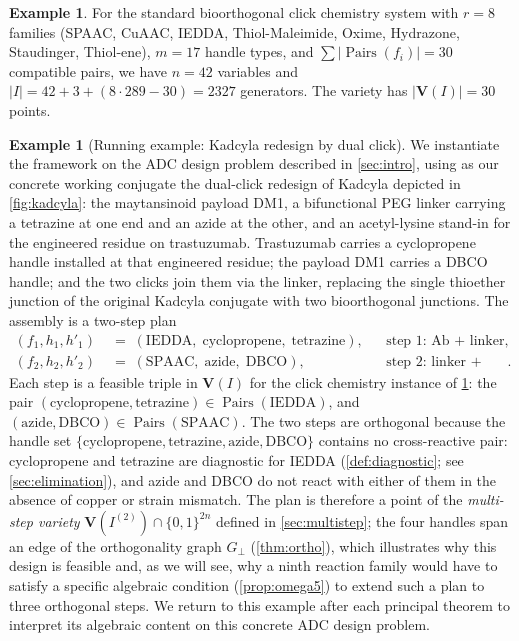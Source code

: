 \documentclass[preprint,12pt]{elsarticle}
\theoremstyle{definition}
\newtheorem{example}[theorem]{Example}
\theoremstyle{remark}
\newcommand{\Var}{\mathbf{V}}
\DeclareMathOperator{\Pairs}{Pairs}
\begin{document}
\begin{example}\label{ex:clickchem}
For the standard bioorthogonal click chemistry system with
$r = 8$ families (SPAAC, CuAAC, IEDDA, Thiol-Maleimide, Oxime,
Hydrazone, Staudinger, Thiol-ene), $m = 17$ handle types, and
$\sum |\Pairs(f_i)| = 30$ compatible pairs, we have
$n = 42$ variables and $|I| = 42 + 3 + (8 \cdot 289 - 30) = 2327$
generators.  The variety has $|\Var(I)| = 30$ points.
\end{example}

\begin{example}[Running example: Kadcyla redesign by dual click]\label{ex:kadcyla}
We instantiate the framework on the ADC design problem described
in \cref{sec:intro}, using as our concrete working conjugate the
dual-click redesign of Kadcyla depicted in \cref{fig:kadcyla}:
the maytansinoid payload DM1, a bifunctional PEG linker carrying
a tetrazine at one end and an azide at the other, and an
acetyl-lysine stand-in for the engineered residue on
trastuzumab.  Trastuzumab carries a cyclopropene handle installed
at that engineered residue; the payload DM1 carries a DBCO
handle; and the two clicks join them via the linker, replacing
the single thioether junction of the original Kadcyla conjugate
with two bioorthogonal junctions.
The assembly is a two-step plan
\begin{align*}
  (f_1, h_1, h'_1)
    &\;=\; (\mathrm{IEDDA},\; \text{cyclopropene},\; \text{tetrazine}),
    &&\text{step 1: Ab + linker}, \\
  (f_2, h_2, h'_2)
    &\;=\; (\mathrm{SPAAC},\; \text{azide},\; \text{DBCO}),
    &&\text{step 2: linker + DM1}.
\end{align*}
Each step is a feasible triple in $\Var(I)$ for
the click chemistry instance of \cref{ex:clickchem}: the pair
$(\text{cyclopropene}, \text{tetrazine}) \in \Pairs(\mathrm{IEDDA})$,
and $(\text{azide}, \text{DBCO}) \in \Pairs(\mathrm{SPAAC})$.  The
two steps are orthogonal because the handle set
$\{\text{cyclopropene},\allowbreak \text{tetrazine},\allowbreak
\text{azide},\allowbreak \text{DBCO}\}$
contains no cross-reactive pair: cyclopropene and tetrazine are
diagnostic for IEDDA (\cref{def:diagnostic}; see
\cref{sec:elimination}), and azide and DBCO do not react with
either of them in the absence of copper or strain mismatch.
The plan is therefore a point of the \emph{multi-step variety}
$\Var(I^{(2)}) \cap \{0,1\}^{2n}$ defined in
\cref{sec:multistep}; the four handles span an edge of the
orthogonality graph $G_\perp$ (\cref{thm:ortho}), which
illustrates why this design is feasible and, as we will see, why
a ninth reaction family would have to satisfy a specific
algebraic condition (\cref{prop:omega5}) to extend such
a plan to three orthogonal steps.  We return to this example after
each principal theorem to interpret its algebraic content on this
concrete ADC design problem.
\end{example}
\end{document}
